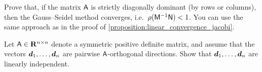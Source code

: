 \begin{exercise}
    \label{exercise:linear_convergence_gauss_seidel}
    Prove that, if the matrix $\mathsf A$ is strictly diagonally dominant (by rows or columns),
    then the Gauss--Seidel method converges, i.e.\ $\rho(\mathsf M^{-1} \mathsf N) < 1$.
    You can use the same approach as in the proof of \cref{proposition:linear_convergence_jacobi}.
\end{exercise}

\begin{exercise}
    \label{exercise:linear_independence_conjugate_directions}
    Let $\mathsf A \in \mathbf R^{n \times n}$ denote a symmetric positive definite matrix,
    and assume that the vectors $\mathbf{\boldsymbol{d}}_1, \dotsc, \mathbf{\boldsymbol{d}}_n$ are pairwise $\mathsf A$-orthogonal directions.
    Show that $\mathbf{\boldsymbol{d}}_1, \dotsc, \mathbf{\boldsymbol{d}}_n$ are linearly independent.
\end{exercise}

